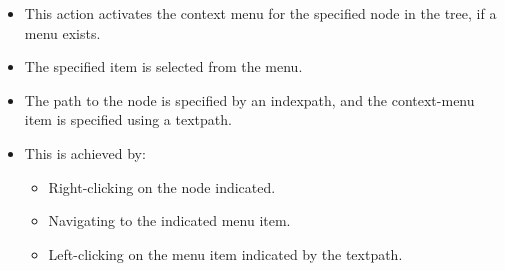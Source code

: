  \begin{itemize}
\item This action activates the context menu for the specified node in the tree, if a menu exists.
\item The specified item is  selected from the menu.
\item The path to the node is specified by an indexpath, and the context-menu item is specified using a textpath.
\item This is achieved by:
  \begin{itemize}
    \item Right-clicking on the node indicated.
    \item Navigating to the indicated menu item.
    \item Left-clicking on the menu item indicated by the textpath.
  \end{itemize}
\end{itemize}
